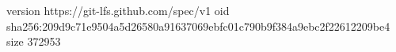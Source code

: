 version https://git-lfs.github.com/spec/v1
oid sha256:209d9c71e9504a5d26580a91637069ebfc01c790b9f384a9ebc2f22612209be4
size 372953
